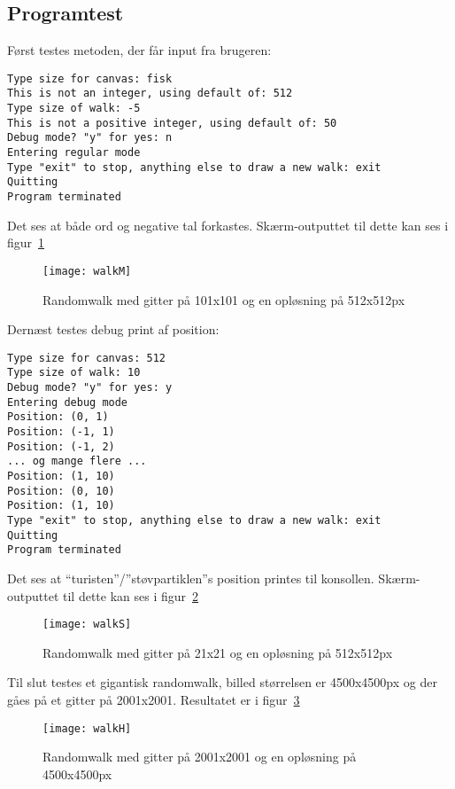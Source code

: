 
\subsection{Programtest}
Først testes metoden, der får input fra brugeren:

\begin{lstlisting}
Type size for canvas: fisk
This is not an integer, using default of: 512
Type size of walk: -5
This is not a positive integer, using default of: 50
Debug mode? "y" for yes: n
Entering regular mode
Type "exit" to stop, anything else to draw a new walk: exit
Quitting
Program terminated
\end{lstlisting}
Det ses at både ord og negative tal forkastes. Skærm-outputtet til dette kan ses i figur~\ref{fig:walkM}

\begin{figure}[h!]
	\centering
	\texttt{[image: walkM]}
		\caption{Randomwalk med gitter på 101x101 og en opløsning på 512x512px}\label{fig:walkM}
\end{figure}

Dernæst testes debug print af position:
\begin{lstlisting}
Type size for canvas: 512
Type size of walk: 10
Debug mode? "y" for yes: y
Entering debug mode
Position: (0, 1)
Position: (-1, 1)
Position: (-1, 2)
... og mange flere ...
Position: (1, 10)
Position: (0, 10)
Position: (1, 10)
Type "exit" to stop, anything else to draw a new walk: exit
Quitting
Program terminated
\end{lstlisting}
Det ses at ``turisten''/''støvpartiklen''s position printes til konsollen. Skærm-outputtet til dette kan ses i figur~\ref{fig:walkS}

\begin{figure}[h!]
	\centering
	\texttt{[image: walkS]}
		\caption{Randomwalk med gitter på 21x21 og en opløsning på 512x512px}\label{fig:walkS}
\end{figure}

Til slut testes et gigantisk randomwalk, billed størrelsen er 4500x4500px og der gåes på et gitter på 2001x2001. Resultatet er i figur~\ref{fig:walkH}

\begin{figure}[h!]
	\centering
	\texttt{[image: walkH]}
		\caption{Randomwalk med gitter på 2001x2001 og en opløsning på 4500x4500px}\label{fig:walkH}
\end{figure}